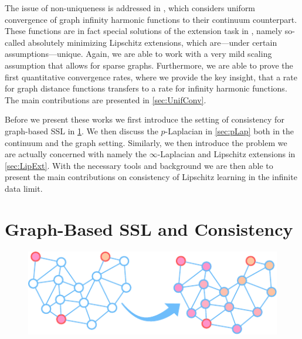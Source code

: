 The issue of non-uniqueness is addressed in \cite{bungert2021uniform}, which considers uniform convergence of graph infinity harmonic functions to their continuum counterpart. These functions are in fact special solutions of the extension task  in \cite{roith2022continuum}, namely so-called absolutely minimizing Lipschitz extensions, which are---under certain assumptions---unique. Again, we are able to work with a very mild scaling assumption that allows for sparse graphs. Furthermore, we are able to prove the first quantitative convergence rates, where we provide the key insight, that a rate for graph distance functions transfers to a rate for infinity harmonic functions. The main contributions are presented in \cref{sec:UnifConv}.


Before we present these works we first introduce the setting of consistency for graph-based SSL in \cref{sec:GSSL}. We then discuss the $p$-Laplacian in \cref{sec:pLap} both in the continuum and the graph setting. Similarly, we then introduce the problem we are actually concerned with namely the $\infty$-Laplacian and Lipschitz extensions in \cref{sec:LipExt}. With the necessary tools and background we are then able to present the main contributions on consistency of Lipschitz learning in the infinite data limit.
%
%
%
%
%
\section{Graph-Based SSL and Consistency}\label{sec:GSSL}

\begin{figure}
\centering
\includegraphics[width=.5\textwidth]{atelier/paradigms/GSSL.pdf}
\end{figure}

